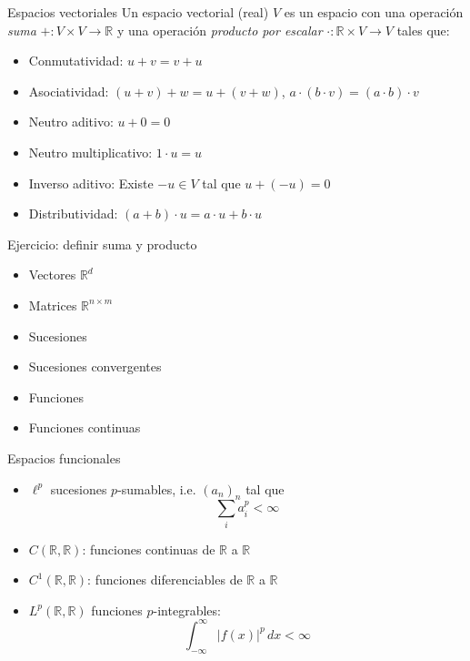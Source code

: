 \documentclass[12pt,aspectratio=169,xcolor=dvipsnames]{beamer}
\newcommand{\R}{\mathbb{R}}
\begin{document}
\begin{frame}[t]{Espacios vectoriales}
    Un espacio vectorial (real) $V$ es un espacio con una operación \emph{suma} $+:V\times V \to \R$ y una operación \emph{producto por escalar} $\cdot: \R\times V \to V$ tales que:
    \begin{itemize}
        \item Conmutatividad: $u+v=v+u$
        \item Asociatividad: $(u+v)+w =u+(v+w)$, $a\cdot(b\cdot v)=(a\cdot b)\cdot v$
        \item Neutro aditivo: $u + 0 = 0$
        \item Neutro multiplicativo: $1\cdot u = u$
        \item Inverso aditivo: Existe $-u\in V$ tal que $u + (-u) = 0$
        \item Distributividad: $(a+b)\cdot u = a\cdot u + b\cdot u$
    \end{itemize}
    
    \vspace{0.5cm}
\end{frame}
\begin{frame}{Ejercicio: definir suma y producto}
    \begin{itemize}
        \item Vectores $\R^d$
        \item Matrices $\R^{n\times m}$
        \item Sucesiones
        \item Sucesiones convergentes
        \item Funciones 
        \item Funciones continuas
    \end{itemize}

    \vspace{1cm}
\end{frame}
\begin{frame}{Espacios funcionales}
    \begin{itemize}
        \item $\ell^p$ sucesiones $p$-sumables, i.e. $(a_n)_n$ tal que
                $$ \sum_i a_i^p < \infty $$
        \item $C(\R,\R)$: funciones continuas de $\R$ a $\R$
        \item $C^1(\R, \R)$: funciones diferenciables de $\R$ a $\R$
        \item $L^p(\R,\R)$ funciones $p$-integrables:
                $$\int_{-\infty}^\infty |f(x)|^p\,dx < \infty $$
    \end{itemize}
\end{frame}
\end{document}

